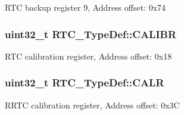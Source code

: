 R\-T\-C backup register 9, Address offset\-: 0x74 \hypertarget{struct_r_t_c___type_def_a2403d29b2bfffb734ebef6642c0d2724}{
\subsubsection[{C\-A\-L\-I\-B\-R}]{ uint32\-\_\-t R\-T\-C\-\_\-\-Type\-Def\-::\-C\-A\-L\-I\-B\-R}}\label{struct_r_t_c___type_def_a2403d29b2bfffb734ebef6642c0d2724}
R\-T\-C calibration register, Address offset\-: 0x18 \hypertarget{struct_r_t_c___type_def_aea66ea813830c2f3ff207464794397a4}{
\subsubsection[{C\-A\-L\-R}]{ uint32\-\_\-t R\-T\-C\-\_\-\-Type\-Def\-::\-C\-A\-L\-R}}\label{struct_r_t_c___type_def_aea66ea813830c2f3ff207464794397a4}
R\-R\-T\-C calibration register, Address offset\-: 0x3\-C

